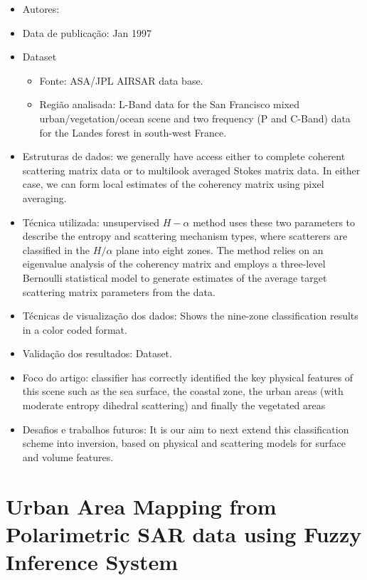 \documentclass[paper=a4, fontsize=11pt]{scrartcl}
\begin{document}
\begin{itemize}
    \item Autores:~\cite{cloude1997entropy}
    \item Data de publicação: Jan 1997
    \item Dataset
    \begin{itemize}
        \item Fonte: ASA/JPL AIRSAR data base.
        \item Região analisada: L-Band data for the San Francisco mixed urban/vegetation/ocean scene and two frequency (P and C-Band) data for the Landes forest in south-west France.
    \end{itemize}
    \item Estruturas de dados: we generally have access either to complete coherent scattering matrix data or to multilook averaged Stokes matrix data. In either case, we can form local estimates of the coherency matrix using pixel averaging.
    \item Técnica utilizada: unsupervised $H-\alpha$ method uses these two parameters to describe the entropy and scattering mechanism types, where scatterers are classified in the $H/\alpha$ plane into eight zones. The method relies on an eigenvalue analysis of the coherency matrix and employs a three-level Bernoulli statistical model to generate estimates of the average target scattering matrix parameters from the data.
    \item Técnicas de visualização dos dados: Shows the nine-zone classification results in a color coded format.
    \item Validação dos resultados: Dataset.
    \item Foco do artigo: classifier has correctly identified the key physical features of this scene such as the sea surface, the coastal zone, the urban areas (with moderate entropy dihedral scattering) and finally the vegetated areas 
    \item Desafios e trabalhos futuros: It is our aim to next extend this classification scheme into inversion, based on physical and scattering models for surface and volume features.
\end{itemize}

\newpage

\section*{Urban Area Mapping from Polarimetric SAR data using Fuzzy Inference System}
\end{document}
